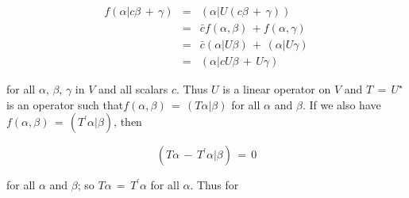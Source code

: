 \[\begin{array}{lcl}f(\alpha|c\beta\,+\,\gamma)&=&(\alpha|U(c\beta\,+\,\gamma))\\ &=&\bar{c}f(\alpha,\beta)\,+f(\alpha,\gamma)\\ &=&\bar{c}(\alpha|U\beta)\,+\,(\alpha|U\gamma)\\ &=&(\alpha|cU\beta\,+\,U\gamma)\end{array}\]

for all \(\alpha\), \(\beta\), \(\gamma\) in \(V\) and all scalars \(c\). Thus \(U\) is a linear operator on \(V\) and \(T\,=\,U^{\star}\) is an operator such that\(f(\alpha,\beta)\,=\,(T\alpha|\beta)\) for all \(\alpha\) and \(\beta\). If we also have \(f(\alpha,\beta)\,=\,(T^{\prime}\alpha|\beta)\), then

\[(T\alpha\,-\,T^{\prime}\alpha|\beta)\,=\,0\]

for all \(\alpha\) and \(\beta\); so \(T\alpha\,=\,T^{\prime}\alpha\) for all \(\alpha\). Thus for 